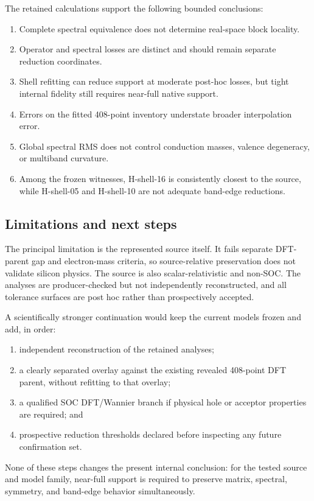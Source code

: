 \documentclass[11pt]{article}
\begin{document}
The retained calculations support the following bounded conclusions:
\begin{enumerate}
  \item Complete spectral equivalence does not determine real-space block locality.
  \item Operator and spectral losses are distinct and should remain separate reduction
    coordinates.
  \item Shell refitting can reduce support at moderate post-hoc losses, but tight
    internal fidelity still requires near-full native support.
  \item Errors on the fitted 408-point inventory understate broader interpolation error.
  \item Global spectral RMS does not control conduction masses, valence degeneracy, or
    multiband curvature.
  \item Among the frozen witnesses, H-shell-16 is consistently closest to the source,
    while H-shell-05 and H-shell-10 are not adequate band-edge reductions.
\end{enumerate}

\subsection{Limitations and next steps}

The principal limitation is the represented source itself.  It fails separate
DFT-parent gap and electron-mass criteria, so source-relative preservation does not
validate silicon physics.  The source is also scalar-relativistic and non-SOC.  The
analyses are producer-checked but not independently reconstructed, and all tolerance
surfaces are post hoc rather than prospectively accepted.

A scientifically stronger continuation would keep the current models frozen and add,
in order:
\begin{enumerate}
  \item independent reconstruction of the retained analyses;
  \item a clearly separated overlay against the existing revealed 408-point DFT parent,
    without refitting to that overlay;
  \item a qualified SOC DFT/Wannier branch if physical hole or acceptor properties are
    required; and
  \item prospective reduction thresholds declared before inspecting any future
    confirmation set.
\end{enumerate}
None of these steps changes the present internal conclusion: for the tested source and
model family, near-full support is required to preserve matrix, spectral, symmetry, and
band-edge behavior simultaneously.
\end{document}
